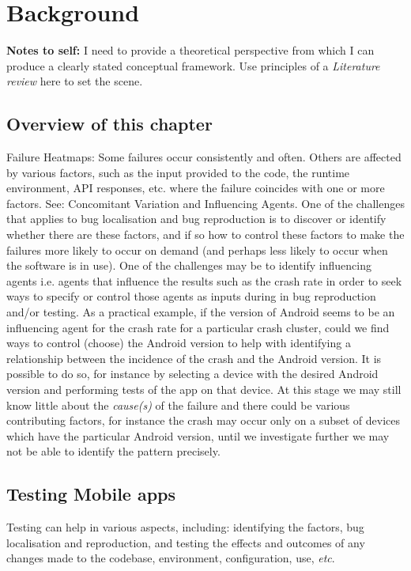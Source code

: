 \chapter{Background}
\textbf{Notes to self:}
I need to provide a theoretical perspective from which I can produce a clearly stated conceptual framework\cite{weinberg2006weinberg}. Use principles of a \textit{Literature review} here to set the scene.

\section{Overview of this chapter}


Failure Heatmaps: Some failures occur consistently and often. Others are affected by various factors, such as the input provided to the code, the runtime environment, API responses, etc. where the failure coincides with one or more factors. See: Concomitant Variation\cite{mill1884system} and Influencing Agents\cite{mill1884system}. One of the challenges that applies to bug localisation and bug reproduction is to discover or identify whether there are these factors, and if so how to control these factors to make the failures more likely to occur on demand (and perhaps less likely to occur when the software is in use). One of the challenges may be to identify influencing agents\cite{mill1884system} i.e. agents that influence the results such as the crash rate in order to seek ways to specify or control those agents as inputs during in bug reproduction and/or testing. As a practical example, if the version of Android seems to be an influencing agent for the crash rate for a particular crash cluster, could we find ways to control (choose) the Android version to help with identifying a relationship between the incidence of the crash and the Android version. It is possible to do so, for instance by selecting a device with the desired Android version and performing tests of the app on that device. At this stage we may still know little about the \textit{cause(s)} of the failure and there could be various contributing factors, for instance the crash may occur only on a subset of devices which have the particular Android version, until we investigate further we may not be able to identify the pattern precisely. 

\section{Testing Mobile apps}
Testing can help in various aspects, including: identifying the factors, bug localisation and reproduction, and testing the effects and outcomes of any changes made to the codebase, environment, configuration, use, \textit{etc}.

